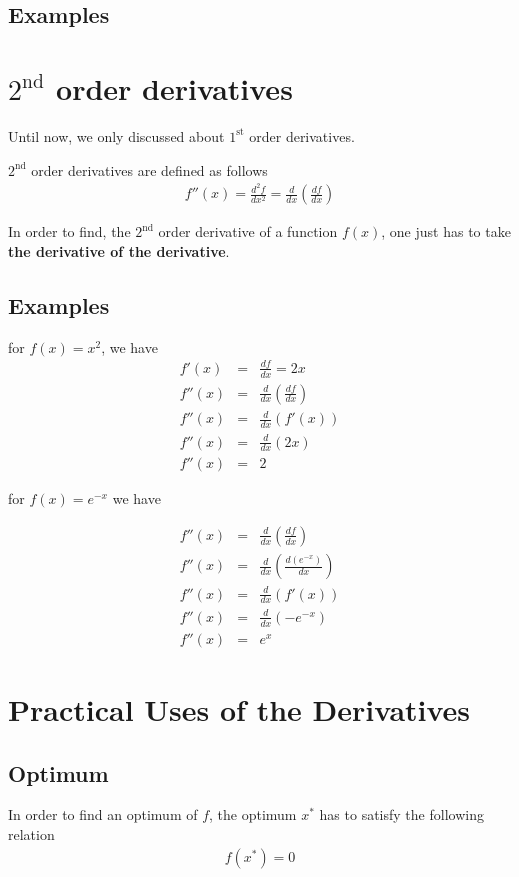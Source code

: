 \documentclass[a4paper] {scrartcl}%
\begin{document}
\subsection{Examples}

\section{$2^{\text{nd}}$ order derivatives}
Until now, we only discussed about $1^{\text{st}}$ order derivatives.

$2^{\text{nd}}$ order derivatives are defined as follows	
\begin{eqnarray}
	f''(x)=\frac{d^2 f}{dx^2} = \frac{d}{dx}\left(\frac{df}{dx}\right)
\end{eqnarray}

In order to find, the $2^{\text{nd}}$ order derivative of a function $f(x)$, one just has to take \textbf{the derivative of the derivative}.

\subsection{Examples}
for $f(x)=x^2$, we have
\begin{eqnarray*}
	f'(x)&=&\frac{df}{dx}=2x\\
	f''(x)&=& \frac{d}{dx}\left(\frac{df}{dx}\right)\\
	f''(x)&=& \frac{d}{dx}\left(f'(x)\right)\\
	f''(x)&=& \frac{d}{dx}\left(2x\right)\\
	f''(x)&=& 2	
\end{eqnarray*} 

for $f(x)=e^{-x}$ we have

\begin{eqnarray*}
	f''(x)&=& \frac{d}{dx}\left(\frac{df}{dx}\right)\\
	f''(x)&=& \frac{d}{dx}\left(\frac{d(e^{-x})}{dx}\right)\\
	f''(x)&=& \frac{d}{dx}\left(f'(x)\right)\\
	f''(x)&=& \frac{d}{dx}\left(-e^{-x}\right)\\
	f''(x)&=& e^{x}
\end{eqnarray*}

\section{Practical Uses of the Derivatives}
\subsection{Optimum}
In order to find an optimum of $f$, the optimum $x^*$ has to satisfy the following relation
	\begin{eqnarray}
		f(x^*)=0
	\end{eqnarray}
	
\end{document}
